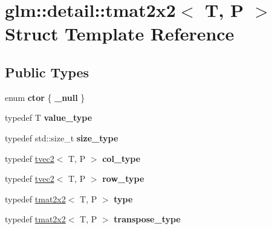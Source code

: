 \hypertarget{structglm_1_1detail_1_1tmat2x2}{\section{glm\-:\-:detail\-:\-:tmat2x2$<$ T, P $>$ Struct Template Reference}
\label{structglm_1_1detail_1_1tmat2x2}
}
\subsection*{Public Types}
\begin{DoxyCompactItemize}
\item 
enum {\bfseries ctor} \{ {\bfseries \-\_\-null}
 \}
\item 
\hypertarget{structglm_1_1detail_1_1tmat2x2_aa592f519609fc243aa0d63a843651a88}{typedef T {\bfseries value\-\_\-type}}\label{structglm_1_1detail_1_1tmat2x2_aa592f519609fc243aa0d63a843651a88}

\item 
\hypertarget{structglm_1_1detail_1_1tmat2x2_abd8446f60873d982f61a108727193848}{typedef std\-::size\-\_\-t {\bfseries size\-\_\-type}}\label{structglm_1_1detail_1_1tmat2x2_abd8446f60873d982f61a108727193848}

\item 
\hypertarget{structglm_1_1detail_1_1tmat2x2_ae8c6de6197aa1b65adf15c40197c04d1}{typedef \hyperlink{structglm_1_1detail_1_1tvec2}{tvec2}$<$ T, P $>$ {\bfseries col\-\_\-type}}\label{structglm_1_1detail_1_1tmat2x2_ae8c6de6197aa1b65adf15c40197c04d1}

\item 
\hypertarget{structglm_1_1detail_1_1tmat2x2_a4c5c3a87c9c7ff8e725e928e71c7a260}{typedef \hyperlink{structglm_1_1detail_1_1tvec2}{tvec2}$<$ T, P $>$ {\bfseries row\-\_\-type}}\label{structglm_1_1detail_1_1tmat2x2_a4c5c3a87c9c7ff8e725e928e71c7a260}

\item 
\hypertarget{structglm_1_1detail_1_1tmat2x2_a8d480bfd28c81ceebb28f78aa1fc5302}{typedef \hyperlink{structglm_1_1detail_1_1tmat2x2}{tmat2x2}$<$ T, P $>$ {\bfseries type}}\label{structglm_1_1detail_1_1tmat2x2_a8d480bfd28c81ceebb28f78aa1fc5302}

\item 
\hypertarget{structglm_1_1detail_1_1tmat2x2_a91b971bd280c2387d22346261851033a}{typedef \hyperlink{structglm_1_1detail_1_1tmat2x2}{tmat2x2}$<$ T, P $>$ {\bfseries transpose\-\_\-type}}\label{structglm_1_1detail_1_1tmat2x2_a91b971bd280c2387d22346261851033a}

\end{DoxyCompactItemize}
